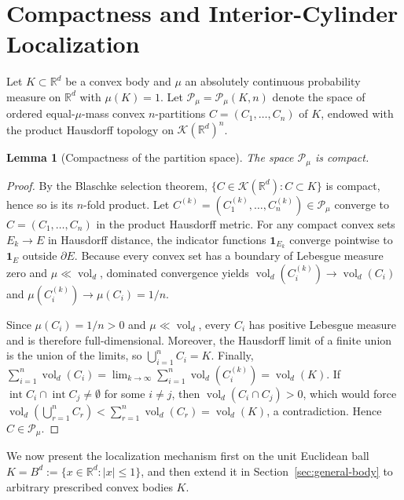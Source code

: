\documentclass[11pt,a4paper]{amsart}
\numberwithin{equation}{section}
\newtheorem{lemma}[theorem]{Lemma}
\theoremstyle{definition}
\newcommand{\R}{\mathbb{R}}
\newcommand{\Kcal}{\mathcal{K}}
\newcommand{\Pcal}{\mathcal{P}}
\newcommand{\inte}{\operatorname{int}}
\newcommand{\vol}{\operatorname{vol}}
\newcommand{\one}{\mathbf{1}}
\begin{document}
\section{Compactness and Interior-Cylinder Localization}
\label{sec:ball-localization}

Let $K \subset \R^d$ be a convex body and $\mu$ an absolutely continuous probability measure on $\R^d$ with $\mu(K) = 1$. Let $\Pcal_\mu = \Pcal_\mu(K, n)$ denote the space of ordered equal-$\mu$-mass convex $n$-partitions $C = (C_1, \dots, C_n)$ of $K$, endowed with the product Hausdorff topology on $\Kcal(\R^d)^n$.

\begin{lemma}[Compactness of the partition space]
\label{lem:compactness}
The space $\Pcal_\mu$ is compact.
\end{lemma}

\begin{proof}
By the Blaschke selection theorem, $\{C \in \Kcal(\R^d) : C \subset K\}$ is compact, hence so is its $n$-fold product. Let $C^{(k)} = (C_1^{(k)}, \dots, C_n^{(k)}) \in \Pcal_\mu$ converge to $C = (C_1, \dots, C_n)$ in the product Hausdorff metric. For any compact convex sets $E_k \to E$ in Hausdorff distance, the indicator functions $\one_{E_k}$ converge pointwise to $\one_E$ outside $\partial E$. Because every convex set has a boundary of Lebesgue measure zero and $\mu \ll \vol_d$, dominated convergence yields $\vol_d(C_i^{(k)}) \to \vol_d(C_i)$ and $\mu(C_i^{(k)}) \to \mu(C_i) = 1/n$.

Since $\mu(C_i) = 1/n > 0$ and $\mu \ll \vol_d$, every $C_i$ has positive Lebesgue measure and is therefore full-dimensional. Moreover, the Hausdorff limit of a finite union is the union of the limits, so $\bigcup_{i=1}^n C_i = K$. Finally, $\sum_{i=1}^n \vol_d(C_i) = \lim_{k\to\infty} \sum_{i=1}^n \vol_d(C_i^{(k)}) = \vol_d(K)$. If $\inte C_i \cap \inte C_j \ne \emptyset$ for some $i \ne j$, then $\vol_d(C_i \cap C_j) > 0$, which would force $\vol_d(\bigcup_{r=1}^n C_r) < \sum_{r=1}^n \vol_d(C_r) = \vol_d(K)$, a contradiction. Hence $C \in \Pcal_\mu$.
\end{proof}

We now present the localization mechanism first on the unit Euclidean ball $K = B^d := \{x \in \R^d : |x| \le 1\}$, and then extend it in Section~\ref{sec:general-body} to arbitrary prescribed convex bodies $K$.
\end{document}
